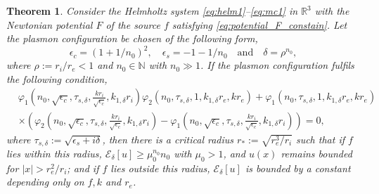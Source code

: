 \documentclass[11pt,reqno,twoside]{amsart}
\newtheorem{thm}{Theorem}[section]
\theoremstyle{definition}
\theoremstyle{remark}
\numberwithin{equation}{section}
\begin{document}
 \begin{thm}\label{thm:CALR}
 Consider the Helmholtz system \eqref{eq:helm1}--\eqref{eq:mc1} in $\mathbb{R}^3$ with the Newtonian potential $F$ of the source $f$ satisfying \eqref{eq:potential_F_constain}. Let the plasmon configuration be chosen of the following form,
  \begin{equation}\label{eq:CALR3d1}
  \epsilon_c=(1+1/n_0)^2 , \quad  \epsilon_s=-1-1/n_0 \quad \mbox{and}  \quad \delta= \rho^{n_0},
 \end{equation}
 where $\rho:=r_i/r_e<1$ and $n_0\in\mathbb{N}$ with $n_0\gg 1$. If the plasmon configuration fulfils the following condition,
\begin{equation}\label{eq:k_three}
\begin{split}
&\varphi_1(n_0,\sqrt{\epsilon_c},\tau_{s,\delta},\frac{kr_i}{\sqrt{\epsilon_c}},k_{1,\delta} r_i)\varphi_2(n_0,\tau_{s,\delta},1,k_{1,\delta} r_e,kr_e) + \varphi_1(n_0,\tau_{s,\delta},1,k_{1,\delta} r_e, kr_e)\\
&\times\left(\varphi_2(n_0,\sqrt{\epsilon_c},\tau_{s,\delta},\frac{kr_i}{\sqrt{\epsilon_c}},k_{1,\delta} r_i) - \varphi_1(n_0,\sqrt{\epsilon_c},\tau_{s,\delta},\frac{kr_i}{\sqrt{\epsilon_c}},k_{1,\delta} r_i)   \right)=0,
\end{split}
\end{equation}
where $\tau_{s,\delta}:=\sqrt{\epsilon_s+i\delta}$, then there is a critical radius $r_*:=\sqrt{r_e^3/r_i}$ such that if $f$ lies within this radius, $\mathscr{E}_{\delta}[u]\geq \mu_0^{n_0} n_0$ with $\mu_0>1$, and $u(x)$ remains bounded for $|x|>r_e^2/r_i$; and if $f$ lies outside this radius, $\mathscr{E}_{\delta}[u]$ is bounded by a constant depending only on $f, k$ and $r_e$.  

\end{thm}
\end{document}
